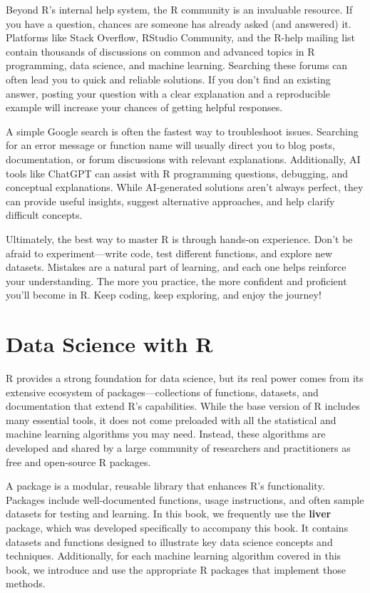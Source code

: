 \documentclass[
]{book}
\theoremstyle{definition}
\theoremstyle{definition}
\theoremstyle{definition}
\theoremstyle{definition}
\theoremstyle{remark}
\begin{document}
Beyond R's internal help system, the R community is an invaluable resource. If you have a question, chances are someone has already asked (and answered) it. Platforms like Stack Overflow, RStudio Community, and the R-help mailing list contain thousands of discussions on common and advanced topics in R programming, data science, and machine learning. Searching these forums can often lead you to quick and reliable solutions. If you don't find an existing answer, posting your question with a clear explanation and a reproducible example will increase your chances of getting helpful responses.

A simple Google search is often the fastest way to troubleshoot issues. Searching for an error message or function name will usually direct you to blog posts, documentation, or forum discussions with relevant explanations. Additionally, AI tools like ChatGPT can assist with R programming questions, debugging, and conceptual explanations. While AI-generated solutions aren't always perfect, they can provide useful insights, suggest alternative approaches, and help clarify difficult concepts.

Ultimately, the best way to master R is through hands-on experience. Don't be afraid to experiment---write code, test different functions, and explore new datasets. Mistakes are a natural part of learning, and each one helps reinforce your understanding. The more you practice, the more confident and proficient you'll become in R. Keep coding, keep exploring, and enjoy the journey!

\section{Data Science with R}\label{data-science-with-r}

R provides a strong foundation for data science, but its real power comes from its extensive ecosystem of packages---collections of functions, datasets, and documentation that extend R's capabilities. While the base version of R includes many essential tools, it does not come preloaded with all the statistical and machine learning algorithms you may need. Instead, these algorithms are developed and shared by a large community of researchers and practitioners as free and open-source R packages.

A package is a modular, reusable library that enhances R's functionality. Packages include well-documented functions, usage instructions, and often sample datasets for testing and learning. In this book, we frequently use the \textbf{liver} package, which was developed specifically to accompany this book. It contains datasets and functions designed to illustrate key data science concepts and techniques. Additionally, for each machine learning algorithm covered in this book, we introduce and use the appropriate R packages that implement those methods.
\end{document}
